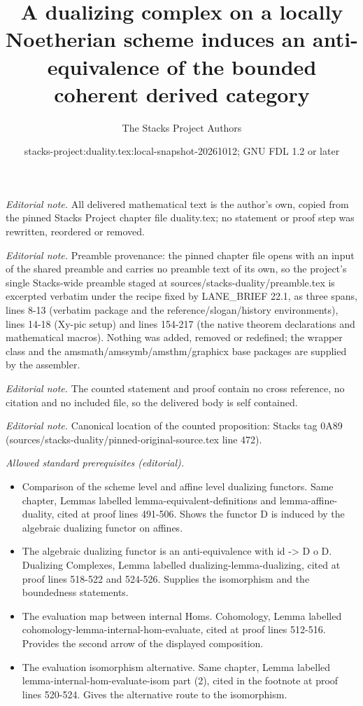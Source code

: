 \documentclass[10pt,a4paper]{amsart}
\title{A dualizing complex on a locally Noetherian scheme induces an anti-equivalence of the bounded coherent derived category}
\author{The Stacks Project Authors}
\date{stacks-project:duality.tex:local-snapshot-20261012; GNU FDL 1.2 or later}
\theoremstyle{plain}
\theoremstyle{definition}
\theoremstyle{remark}
\numberwithin{equation}{subsection}
\begin{document}
\maketitle
\noindent\textit{Editorial note.} All delivered mathematical text is the author's own, copied from the pinned Stacks Project chapter file duality.tex; no statement or proof step was rewritten, reordered or removed.\par\medskip
\noindent\textit{Editorial note.} Preamble provenance: the pinned chapter file opens with an input of the shared preamble and carries no preamble text of its own, so the project's single Stacks-wide preamble staged at sources/stacks-duality/preamble.tex is excerpted verbatim under the recipe fixed by LANE\_BRIEF 22.1, as three spans, lines 8-13 (verbatim package and the reference/slogan/history environments), lines 14-18 (Xy-pic setup) and lines 154-217 (the native theorem declarations and mathematical macros). Nothing was added, removed or redefined; the wrapper class and the amsmath/amssymb/amsthm/graphicx base packages are supplied by the assembler.\par\medskip
\noindent\textit{Editorial note.} The counted statement and proof contain no cross reference, no citation and no included file, so the delivered body is self contained.\par\medskip
\noindent\textit{Editorial note.} Canonical location of the counted proposition: Stacks tag 0A89 (sources/stacks-duality/pinned-original-source.tex line 472).\par\medskip
\noindent\textit{Allowed standard prerequisites (editorial).}\begin{itemize}
\item Comparison of the scheme level and affine level dualizing functors. Same chapter, Lemmas labelled lemma-equivalent-definitions and lemma-affine-duality, cited at proof lines 491-506. Shows the functor D is induced by the algebraic dualizing functor on affines.
\item The algebraic dualizing functor is an anti-equivalence with id -> D o D. Dualizing Complexes, Lemma labelled dualizing-lemma-dualizing, cited at proof lines 518-522 and 524-526. Supplies the isomorphism and the boundedness statements.
\item The evaluation map between internal Homs. Cohomology, Lemma labelled cohomology-lemma-internal-hom-evaluate, cited at proof lines 512-516. Provides the second arrow of the displayed composition.
\item The evaluation isomorphism alternative. Same chapter, Lemma labelled lemma-internal-hom-evaluate-isom part (2), cited in the footnote at proof lines 520-524. Gives the alternative route to the isomorphism.
\end{itemize}\medskip
\end{document}
